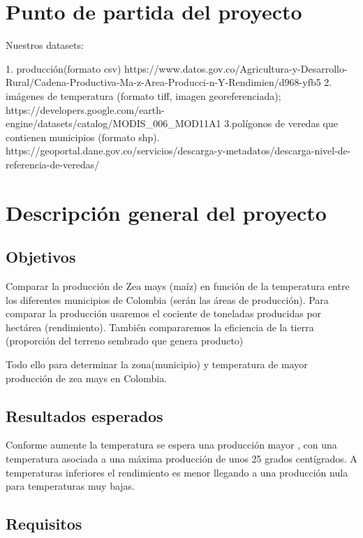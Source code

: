 \documentclass[12pt, spanish]{article}
\begin{document}
\tableofcontents 
\newpage
{}
\setcounter{page}{1}

\section{Punto de partida del proyecto}

Nuestros datasets:

1. producción(formato csv)
https://www.datos.gov.co/Agricultura-y-Desarrollo-Rural/Cadena-Productiva-Ma-z-Area-Producci-n-Y-Rendimien/d968-yfb5
2. imágenes de temperatura (formato tiff, imagen georeferenciada);
https://developers.google.com/earth-engine/datasets/catalog/MODIS_006_MOD11A1
3.polígonos de veredas que contienen municipios (formato shp).
https://geoportal.dane.gov.co/servicios/descarga-y-metadatos/descarga-nivel-de-referencia-de-veredas/

\section{Descripción general del proyecto}

\subsection{Objetivos}

Comparar la producción de Zea mays (maíz) en función de la temperatura entre los diferentes municipios de Colombia (serán las áreas de producción). Para comparar la producción usaremos el cociente de toneladas producidas por hectárea (rendimiento). También compararemos la eficiencia de la tierra (proporción del terreno sembrado que genera producto)

Todo ello para determinar la zona(municipio) y temperatura de mayor producción de zea mays en Colombia.

\subsection{Resultados esperados}

Conforme aumente la temperatura se espera una producción mayor , con una temperatura asociada a una máxima producción de unos 25 grados centígrados. A temperaturas inferiores el rendimiento es menor llegando a una producción nula para temperaturas muy bajas.

\subsection{Requisitos}
\end{document}
